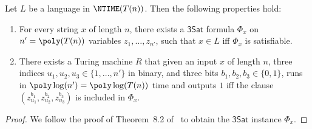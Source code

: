 \documentclass[11pt]{article}
\newcommand{\sat}{\mathsf{3Sat}}
\begin{document}
\begin{theorem}\label{thm:cook-levin}
  Let $L$ be a language in $\NTIME(T(n))$. Then the following
  properties hold:
  \begin{enumerate}
  \item For every string $x$ of length $n$, there exists a $\sat$
    formula $\Phi_x$ on $n' = \poly(T(n))$ variables $z_1, \dots, z_{n'}$, such that $x \in L$ iff
    $\Phi_x$ is satisfiable.
    \item There exists a Turing
      machine $R$ that given an input $x$ of
      length $n$, three indices $u_1, u_2, u_3 \in \{1, \dots, n'\}$ in
      binary, and three bits $b_1, b_2, b_3 \in \{0,1\}$, runs in
      $\poly\log(n') = \poly\log(T(n))$ time and outputs $1$ iff the clause
      $(z_{u_1}^{b_1}, z_{u_2}^{b_2}, z_{u_3}^{b_3})$ is included in $\Phi_x$.
    \end{enumerate}
  \end{theorem}
  \begin{proof}
    We follow the proof of Theorem~8.2 of~\cite{Pap94} to obtain the
    $\sat$ instance $\Phi_x$. 
  \end{proof}
\end{document}
